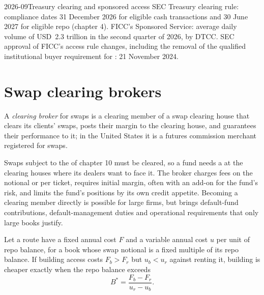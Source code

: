 \begin{dated}{2026-09}{Treasury clearing and sponsored access}\label{dat:m2:getting-access-rates-credit:access}
SEC Treasury clearing rule: compliance dates 31 December 2026 for eligible cash
transactions and 30 June 2027 for eligible repo (chapter 4). FICC's Sponsored Service:
average daily volume of USD~2.3 trillion in the second quarter of 2026, by DTCC. SEC
approval of FICC's access rule changes, including the removal of the qualified
institutional buyer requirement for : 21 November 2024.
\end{dated}

\section{Swap clearing brokers}

\begin{definition}\label{def:m2:getting-access-rates-credit:cb}
A \emph{clearing broker} for swaps is a clearing member
of a swap clearing house that clears its clients' swaps, posts their margin to the
clearing house, and guarantees their performance to it; in the United States it is a
futures commission merchant registered for swaps.
\end{definition}

Swaps subject to the  of chapter 10 must be cleared, so a fund needs a
 at the clearing houses where its dealers want to face it. The broker
charges fees on the notional or per ticket, requires initial margin, often with an
add-on for the fund's risk, and limits the fund's positions by its own credit
appetite. Becoming a clearing member directly is possible for large firms, but brings
default-fund contributions, default-management duties and operational requirements
that only large books justify.

\begin{proposition}\label{prop:m2:getting-access-rates-credit:breakeven}
Let a route have a fixed annual cost $F$ and a variable annual cost $u$ per unit of
repo balance, for a book whose swap notional is a fixed multiple of its repo balance. If
building access costs $F_b > F_r$ but $u_b < u_r$ against renting it, building is
cheaper exactly when the repo balance exceeds
\[
B^* = \frac{F_b - F_r}{u_r - u_b}.
\]
\end{proposition}

